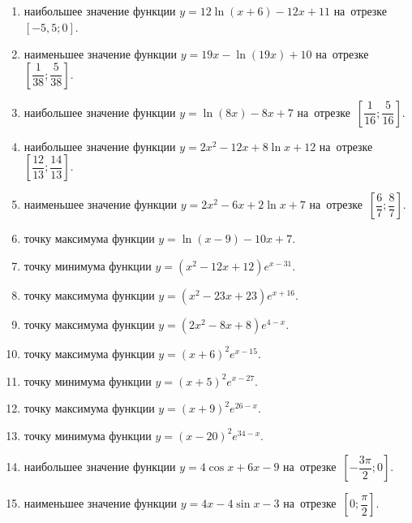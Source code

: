 \documentclass[a4paper,10pt]{article}
\begin{document}
\begin{enumerate}
\item {} наибольшее значение функции $y = 12\ln \left(x+6\right)-12x +11$ на~отрезке~$\left[-5,5;0\right]$.

\item {} наименьшее значение функции $y = 19x-\ln \left(19x\right)+10$ на~отрезке~$\left[\dfrac{1}{38};\dfrac{5}{38}\right]$.

\item {} наибольшее значение функции $y = \ln \left(8x\right)-8x+7$ на~отрезке~$\left[\dfrac{1}{16};\dfrac{5}{16}\right]$.

\item {} наибольшее значение функции $y=2x^2-12x+8\ln x+12$ на~отрезке~$\left[\dfrac{12}{13};\dfrac{14}{13}\right]$.

\item {} наименьшее значение функции $y=2x^2-6x+2\ln x+7$ на~отрезке~$\left[\dfrac{6}{7};\dfrac{8}{7}\right]$.

\item {} точку максимума функции $y=\ln \left(x-9\right)-10x+7$.

\item {} точку минимума функции $y=\left(x^2-12x+12\right)e^{x-31}$.

\item {} точку максимума функции $y=\left(x^2-23x+23\right)e^{x+16}$.

\item {} точку максимума функции $y=\left(2x^2-8x+8\right)e^{4-x}$.

\item {} точку максимума функции $y=\left(x +6\right)^2e^{x-15}$.

\item {} точку минимума функции $y=\left(x +5\right)^2e^{x-27}$.

\item {} точку максимума функции $y=\left(x +9\right)^2e^{26-x}$.

\item {} точку минимума функции $y=\left(x -20\right)^2e^{34-x}$.

\item {} наибольшее значение функции $y=4\cos x+6x -9$ на~отрезке~$\left[-\dfrac{3\pi }{2};0\right]$.

\item {} наименьшее значение функции $y=4x-4\sin x -3$ на~отрезке~$\left[0;\dfrac{\pi }{2}\right]$.


\end{enumerate}
\end{document}
